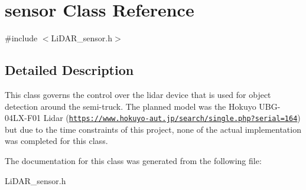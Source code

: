 \hypertarget{classsensor}{}\section{sensor Class Reference}
\label{classsensor}


{\ttfamily \#include $<$Li\+D\+A\+R\+\_\+sensor.\+h$>$}



\subsection{Detailed Description}
This class governs the control over the lidar device that is used for object detection around the semi-\/truck. The planned model was the Hokuyo U\+B\+G-\/04\+L\+X-\/\+F01 Lidar (\href{https://www.hokuyo-aut.jp/search/single.php?serial=164}{\tt https\+://www.\+hokuyo-\/aut.\+jp/search/single.\+php?serial=164}) but due to the time constraints of this project, none of the actual implementation was completed for this class. 

The documentation for this class was generated from the following file\+:\begin{DoxyCompactItemize}
\item 
Li\+D\+A\+R\+\_\+sensor.\+h\end{DoxyCompactItemize}
